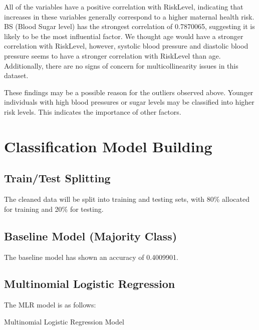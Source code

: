 \documentclass[
  letterpaper,
  DIV=11,
  numbers=noendperiod]{scrartcl}
\begin{document}
All of the variables have a positive correlation with RiskLevel,
indicating that increases in these variables generally correspond to a
higher maternal health risk. BS (Blood Sugar level) has the strongest
correlation of 0.7870065, suggesting it is likely to be the most
influential factor. We thought age would have a stronger correlation
with RiskLevel, however, systolic blood pressure and diastolic blood
pressure seems to have a stronger correlation with RiskLevel than age.
Additionally, there are no signs of concern for multicollinearity issues
in this dataset.

These findings may be a possible reason for the outliers observed above.
Younger individuals with high blood pressures or sugar levels may be
classified into higher risk levels. This indicates the importance of
other factors.

\section{Classification Model
Building}\label{classification-model-building}

\subsection{Train/Test Splitting}\label{traintest-splitting}

The cleaned data will be split into training and testing sets, with 80\%
allocated for training and 20\% for testing.

\subsection{Baseline Model (Majority
Class)}\label{baseline-model-majority-class}

The baseline model has shown an accuracy of 0.4009901.

\subsection{Multinomial Logistic
Regression}\label{multinomial-logistic-regression}

The MLR model is as follows:

\begin{table}

\caption{\label{tbl-mlr-coefs}Multinomial Logistic Regression Model}


\end{table}%
\end{document}
